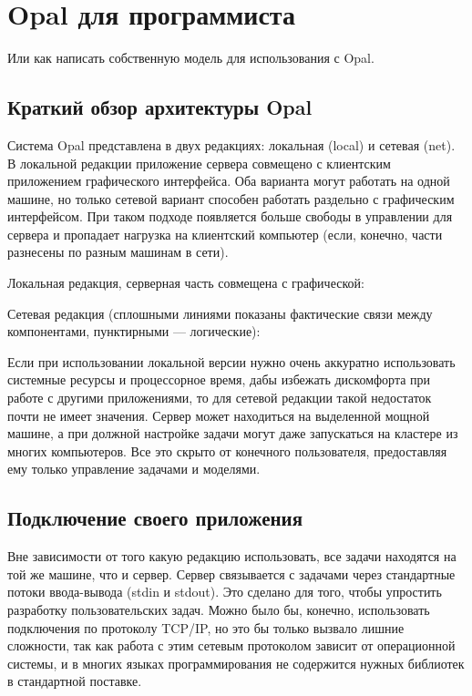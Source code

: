 \chapter{Opal для программиста}

Или как написать собственную модель для использования с Opal.

\section{Краткий обзор архитектуры Opal}

Система Opal представлена в двух редакциях: локальная (local) и сетевая (net). В локальной редакции приложение сервера совмещено с клиентским приложением графического интерфейса. Оба варианта могут работать на одной машине, но только сетевой вариант способен работать раздельно с графическим интерфейсом. При таком подходе появляется больше свободы в управлении для сервера и пропадает нагрузка на клиентский компьютер (если, конечно, части разнесены по разным машинам в сети).

Локальная редакция, серверная часть совмещена с графической:

Сетевая редакция (сплошными линиями показаны фактические связи между компонентами, пунктирными — логические):

Если при использовании локальной версии нужно очень аккуратно использовать системные ресурсы и процессорное время, дабы избежать дискомфорта при работе с другими приложениями, то для сетевой редакции такой недостаток почти не имеет значения. Сервер может находиться на выделенной мощной машине, а при должной настройке задачи могут даже запускаться на кластере из многих компьютеров. Все это скрыто от конечного пользователя, предоставляя ему только управление задачами и моделями.

\section{Подключение своего приложения}

Вне зависимости от того какую редакцию использовать, все задачи находятся на той же машине, что и сервер. Сервер связывается с задачами через стандартные потоки ввода-вывода (stdin и stdout). Это сделано для того, чтобы упростить разработку пользовательских задач. Можно было бы, конечно, использовать подключения по протоколу TCP\slash{}IP, но это бы только вызвало лишние сложности, так как работа с этим сетевым протоколом зависит от операционной системы, и в многих языках программирования не содержится нужных библиотек в стандартной поставке.

